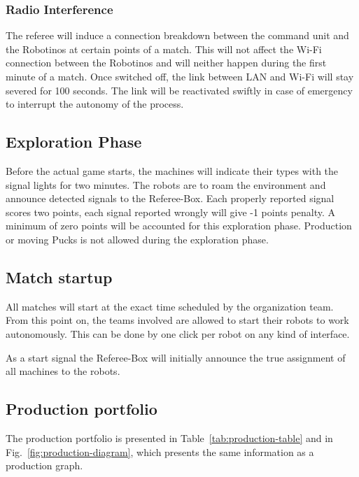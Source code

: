 \documentclass[12pt,twoside]{article}
\newenvironment{rulechange}{}{}
\begin{document}
\subsubsection{Radio Interference}
\label{sec:radio-interference}
The referee will induce a connection breakdown between the command
unit and the Robotinos at certain points of a match. This will not
affect the Wi-Fi connection between the Robotinos and will neither
happen during the first minute of a match. Once switched off, the link
between LAN and Wi-Fi will stay severed for 100 seconds. The link will
be reactivated swiftly in case of emergency to interrupt the autonomy
of the process.


\subsection{Exploration Phase}
\begin{rulechange}
Before the actual game starts, the machines will indicate their types with the
signal lights for two minutes. The robots are to roam the environment and
announce detected signals to the Referee-Box. Each properly reported signal
scores two points, each signal reported wrongly will give -1 points penalty.
A minimum of zero points will be accounted for this exploration phase.
Production or moving Pucks is not allowed during the exploration phase.
\end{rulechange}

\subsection{Match startup}
\label{sec:match-startup}
All matches will start at the exact time scheduled by the organization
team. From this point on, the teams involved are allowed to start
their robots to work autonomously. This can be done by one click per
robot on any kind of interface. 

\begin{rulechange}
As a start signal the Referee-Box will initially announce the true assignment of
all machines to the robots.
\end{rulechange}

\subsection{Production portfolio}
The production portfolio is presented in
Table~\ref{tab:production-table} and in
Fig.~\ref{fig:production-diagram}, which presents the same information
as a production graph.
\end{document}
